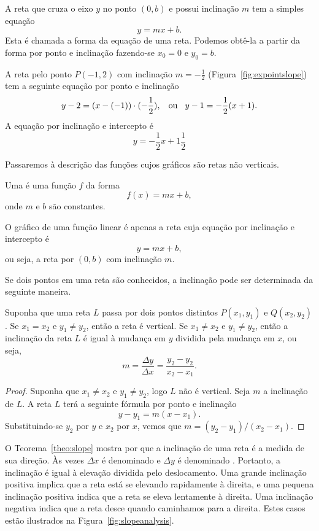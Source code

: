 A reta que cruza o eixo $y$ no ponto $(0,b)$ e possui inclinação $m$
tem a simples equação
\[
  y = mx + b.
\]
Esta é chamada a forma %
%
da equação de uma reta. Podemos obtê-la a partir da forma por
ponto e inclinação fazendo-se $x_0 = 0$ e $y_0 = b$.

\begin{example}
A reta pelo ponto $P(-1,2)$ com inclinação $m = - \frac{1}{2}$
(Figura~\ref{fig:expointslope}) tem a seguinte equação por
ponto e inclinação
\[
  y-2 = (x - (-1))\cdot(-\frac{1}{2}), \hspace{2ex} \text{ou}
  \hspace{2ex} y-1 = -\frac{1}{2}(x+1).
\]
A equação por inclinação e intercepto é
\[
  y = -\frac{1}{2}x + 1\frac{1}{2}
\]
\end{example}


Passaremos à descrição das funções cujos gráficos são retas não verticais.

\begin{defin}
Uma  é uma função $f$ da forma
\[
  f(x) = mx+b,
\]
onde $m$ e $b$ são constantes.
\end{defin}

O gráfico de uma função linear é apenas a reta cuja equação por
inclinação e intercepto é
\[
  y = mx+b,
\]
ou seja, a reta por $(0,b)$ com inclinação $m$.

Se dois pontos em uma reta são conhecidos, a inclinação pode ser
determinada da seguinte maneira.

\begin{theorem}
\label{theo:slope}
Suponha que uma reta $L$ passa por dois pontos distintos $P(x_1,y_1)$
e $Q(x_2,y_2)$. Se $x_1 = x_2$ e $y_1 \ne y_2$, então a reta é vertical.
Se $x_1 \ne x_2$ e $y_1 \ne y_2$, então a inclinação da reta $L$ é
igual à mudança em $y$ dividida pela mudança em $x$, ou seja,
\[
  m = \frac{\Delta y}{\Delta x} = \frac{y_2 - y_2}{x_2 - x_1}.
\]
\end{theorem}

\begin{proof}
Suponha que $x_1 \ne x_2$ e $y_1 \ne y_2$, logo $L$ não é vertical. Seja
$m$ a inclinação de $L$. A reta $L$ terá a seguinte fórmula por ponto e
inclinação
\[
  y - y_1 = m (x-x_1).
\]
Substituindo-se $y_2$ por $y$ e $x_2$ por $x$, vemos que
$m = (y_2 - y_1)/(x_2 - x_1)$.
\end{proof}

O Teorema~\ref{theo:slope} mostra por que a inclinação de uma
reta é a medida de sua direção. Às vezes $\Delta x$ é denominado
 e $\Delta y$ é denominado
. Portanto, a inclinação é igual à elevação
dividida pelo deslocamento. Uma grande inclinação positiva
implica que a reta está se elevando rapidamente à direita,
e uma pequena inclinação positiva indica que a reta se eleva
lentamente à direita. Uma inclinação negativa indica que a
reta desce quando caminhamos para a direita. Estes casos estão
ilustrados na Figura~\ref{fig:slopeanalysis}.

